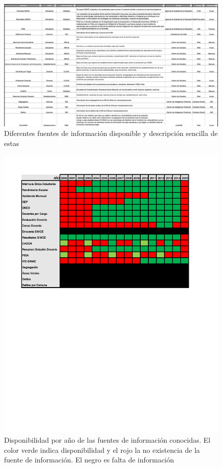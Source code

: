 \begin{figure}[H]
  \centering
    \includegraphics[width=1\textwidth,]{Figuras/fuentesdeinfo}
      \caption{Diferentes fuentes de información disponible y descripción sencilla de estas}
    \label{fig:fuentesdeinfo}
\end{figure}
\begin{figure}[H]
  \centering
    \includegraphics[trim=2cm 13cm 0cm 0cm]{Figuras/DisponibilidadDatos}
      \caption{Disponibilidad por año de las fuentes de información conocidas. El color verde indica disponibilidad y el rojo la no existencia de la fuente de información. El negro es falta de información}
    \label{fig:disponibilidadDatos}
\end{figure}
